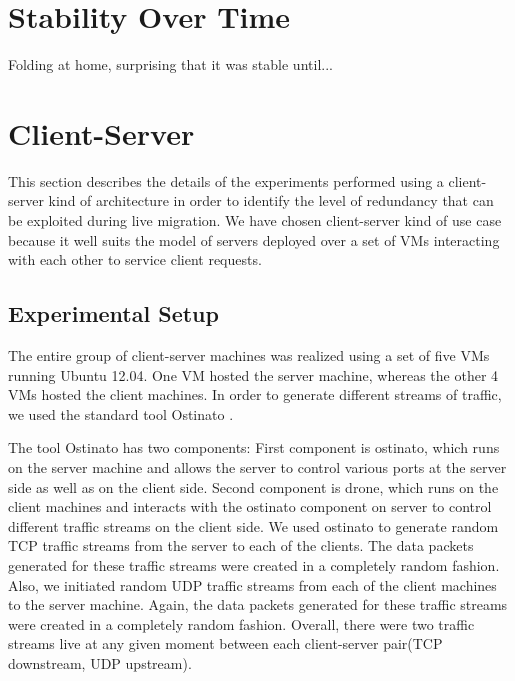 \documentclass{acm_proc_article-sp}
\begin{document}


\section{Stability Over Time}
Folding at home, surprising that it was stable until...

\section{Client-Server}
This section describes the details of the experiments performed using a client-server kind of architecture in order to identify the level of redundancy that can be exploited during live migration. We have chosen client-server kind of use case because it well suits the model of servers deployed over a set of VMs interacting with each other to service client requests.

\subsection{Experimental Setup}
The entire group of client-server machines was realized using a set of five VMs running Ubuntu 12.04. One VM hosted the server machine, whereas the other 4 VMs hosted the client machines. In order to generate different streams of traffic, we used the standard tool Ostinato \cite{ostinato}.

The tool Ostinato has two components: First component is ostinato, which runs on the server machine and allows the server to control various ports at the server side as well as on the client side. Second component is drone, which runs on the client machines and interacts with the ostinato component on server to control different traffic streams on the client side. We used ostinato to generate random TCP traffic streams from the server to each of the clients. The data packets generated for these traffic streams were created in a completely random fashion. Also, we initiated random UDP traffic streams from each of the client machines to the server machine. Again, the data packets generated for these traffic streams were created in a completely random fashion. Overall, there were two traffic streams live at any given moment between each client-server pair(TCP downstream, UDP upstream).
\end{document}
